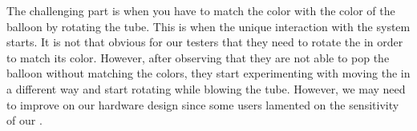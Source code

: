 The challenging part is when you have to match the color with the color of the balloon by rotating the tube. This is when the unique interaction with the system starts. It is not that obvious for our testers that they need to rotate the \tube in order to match its color. However, after observing that they are not able to pop the balloon without matching the colors, they start experimenting with moving the \tube in a different way and start rotating while blowing the tube. However, we may need to improve on our hardware design since some users lamented on the sensitivity of our \tube.
